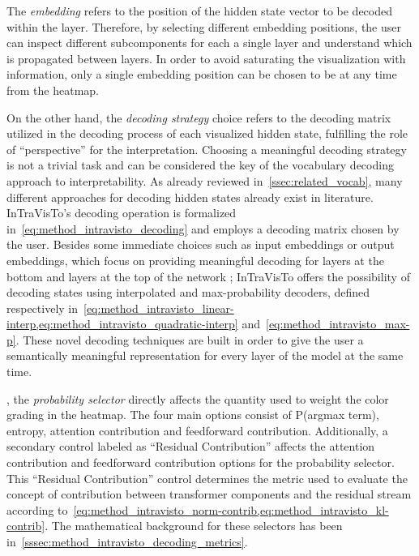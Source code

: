 The \emph{embedding} refers to the position of the hidden state vector to be decoded within the layer.
Therefore, by selecting different embedding positions, the user can inspect different subcomponents for each a single layer and understand which  is propagated between layers.
In order to avoid saturating the visualization with information, only a single embedding position can be chosen to be  at any time from the heatmap.

On the other hand, the \emph{decoding strategy} choice refers to the decoding matrix utilized in the decoding process of each visualized hidden state, fulfilling the role of ``perspective'' for the interpretation.
Choosing a meaningful decoding strategy is not a trivial task and can be considered the key  of the vocabulary decoding approach to interpretability.
As already reviewed in~\cref{ssec:related_vocab}, many different approaches for decoding hidden states already exist in literature.
InTraVisTo's decoding operation is formalized in~\cref{eq:method_intravisto_decoding} and employs a decoding matrix chosen by the user.
Besides some immediate choices such as input embeddings or output embeddings, which focus on providing meaningful decoding for layers at the bottom and layers at the top of the network ; InTraVisTo offers the possibility of decoding states using interpolated and max-probability decoders, defined respectively in~\cref{eq:method_intravisto_linear-interp,eq:method_intravisto_quadratic-interp} and~\cref{eq:method_intravisto_max-p}.
These novel decoding techniques are built in order to give the user a semantically meaningful representation for every layer of the model at the same time.

, the \emph{probability selector} directly affects the quantity used to weight the color grading in the heatmap.
The four main options consist of P(argmax term), entropy, attention contribution and feedforward contribution. %
Additionally, a secondary control labeled as ``Residual Contribution'' affects the attention contribution and feedforward contribution options for the probability selector.
This ``Residual Contribution'' control determines the metric used to evaluate the concept of contribution between transformer components and the residual stream according to~\cref{eq:method_intravisto_norm-contrib,eq:method_intravisto_kl-contrib}.
The mathematical background for these selectors has been  in~\cref{sssec:method_intravisto_decoding_metrics}.

